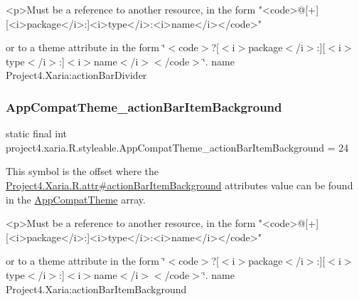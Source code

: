 \begin{DoxyVerb}      <p>Must be a reference to another resource, in the form "<code>@[+][<i>package</i>:]<i>type</i>:<i>name</i></code>"
\end{DoxyVerb}
 or to a theme attribute in the form \char`\"{}$<$code$>$?\mbox{[}$<$i$>$package$<$/i$>$\+:\mbox{]}\mbox{[}$<$i$>$type$<$/i$>$\+:\mbox{]}$<$i$>$name$<$/i$>$$<$/code$>$\char`\"{}.  name Project4.\+Xaria\+:action\+Bar\+Divider \mbox{\label{classproject4_1_1xaria_1_1R_1_1styleable_a41713bbf73db9bc84e075b5f7f3d9eac}} 
\subsubsection{\texorpdfstring{App\+Compat\+Theme\+\_\+action\+Bar\+Item\+Background}{AppCompatTheme\_actionBarItemBackground}}
{\footnotesize\ttfamily static final int project4.\+xaria.\+R.\+styleable.\+App\+Compat\+Theme\+\_\+action\+Bar\+Item\+Background = 24\hspace{0.3cm}{\ttfamily [static]}}

This symbol is the offset where the \hyperlink{}{Project4.\+Xaria.\+R.\+attr\#action\+Bar\+Item\+Background} attribute\textquotesingle{}s value can be found in the \hyperlink{classproject4_1_1xaria_1_1R_1_1styleable_aad8bec413e2350f9404e6ff0e831a85d}{App\+Compat\+Theme} array.

\begin{DoxyVerb}      <p>Must be a reference to another resource, in the form "<code>@[+][<i>package</i>:]<i>type</i>:<i>name</i></code>"
\end{DoxyVerb}
 or to a theme attribute in the form \char`\"{}$<$code$>$?\mbox{[}$<$i$>$package$<$/i$>$\+:\mbox{]}\mbox{[}$<$i$>$type$<$/i$>$\+:\mbox{]}$<$i$>$name$<$/i$>$$<$/code$>$\char`\"{}.  name Project4.\+Xaria\+:action\+Bar\+Item\+Background \mbox{\label{classproject4_1_1xaria_1_1R_1_1styleable_a4ab9cdea85449aae1d84d21ff4fb2cfa}} 

